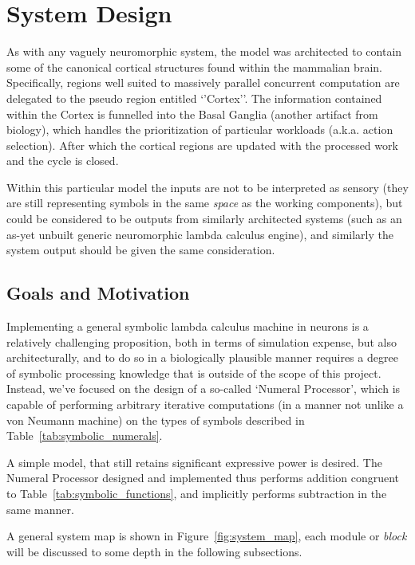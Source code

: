 \documentclass{report}
\begin{document}
\chapter{System Design}

As with any vaguely neuromorphic system, the model was architected to contain some of the canonical cortical structures found within the mammalian brain.
Specifically, regions well suited to massively parallel concurrent computation are delegated to the pseudo region entitled \lq{}\rq{}Cortex\rq{}\rq{}.
The information contained within the Cortex is funnelled into the Basal Ganglia (another artifact from biology), which handles the prioritization of particular workloads (a.k.a. action selection).
After which the cortical regions are updated with the processed work and the cycle is closed.

Within this particular model the inputs are not to be interpreted as sensory (they are still representing symbols in the same \emph{space} as the working components), but could be considered to be outputs from similarly architected systems (such as an as-yet unbuilt generic neuromorphic lambda calculus engine), and similarly the system output should be given the same consideration.

\section{Goals and Motivation}

Implementing a general symbolic lambda calculus machine in neurons is a relatively challenging proposition, both in terms of simulation expense, but also architecturally, and to do so in a biologically plausible manner requires a degree of symbolic processing knowledge that is outside of the scope of this project.
Instead, we\rq{}ve focused on the design of a so-called \lq{}Numeral Processor\rq{}, which is capable of performing arbitrary iterative computations (in a manner not unlike a von Neumann machine) on the types of symbols described in Table~\ref{tab:symbolic_numerals}.

A simple model, that still retains significant expressive power is desired.
The Numeral Processor designed and implemented thus performs addition congruent to Table~\ref{tab:symbolic_functions}, and implicitly performs subtraction in the same manner.

A general system map is shown in Figure~\ref{fig:system_map}, each module or \emph{block} will be discussed to some depth in the following subsections.
\end{document}
